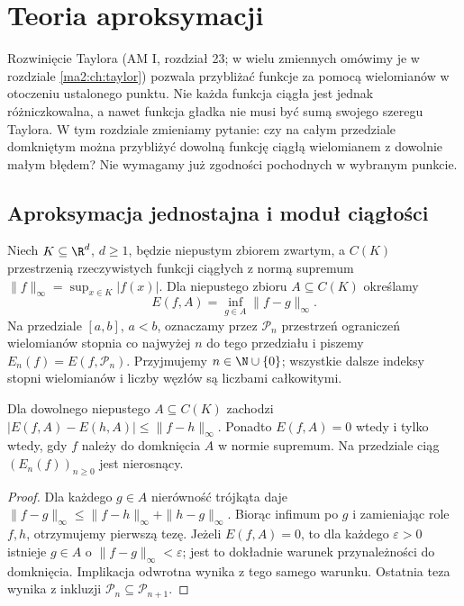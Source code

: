 \chapter{Teoria aproksymacji}
\label{ma2:ch:approximation}

Rozwinięcie Taylora (AM I, rozdział 23;
w wielu zmiennych omówimy je w rozdziale
\ref{ma2:ch:taylor}) pozwala przybliżać funkcje
za pomocą wielomianów w otoczeniu ustalonego punktu.
Nie każda funkcja ciągła jest jednak różniczkowalna,
a nawet funkcja gładka nie musi być sumą swojego
szeregu Taylora. W tym rozdziale zmieniamy pytanie:
czy na całym przedziale domkniętym można przybliżyć
dowolną funkcję ciągłą wielomianem z dowolnie małym
błędem? Nie wymagamy już zgodności pochodnych
w wybranym punkcie.

\section{Aproksymacja jednostajna i moduł ciągłości}

\begin{definicja}
\label{ma2:def:approx-best-error}
Niech $K\subseteq\R^d$, $d\ge1$, będzie niepustym zbiorem
zwartym, a $C(K)$ przestrzenią rzeczywistych funkcji
ciągłych z normą supremum
$\|f\|_\infty=\sup_{x\in K}|f(x)|$.
Dla niepustego zbioru $A\subseteq C(K)$ określamy
\[
 E(f,A)=\inf_{g\in A}\|f-g\|_\infty.
\]
Na przedziale $[a,b]$, $a<b$, oznaczamy przez
$\mathcal P_n$ przestrzeń ograniczeń wielomianów
stopnia co najwyżej $n$ do tego przedziału
i piszemy $E_n(f)=E(f,\mathcal P_n)$.
Przyjmujemy $n\in\N\cup\{0\}$; wszystkie dalsze
indeksy stopni wielomianów i liczby węzłów
są liczbami całkowitymi.
\end{definicja}

\begin{stwierdzenie}
\label{ma2:prop:approx-distance}
Dla dowolnego niepustego $A\subseteq C(K)$
zachodzi $|E(f,A)-E(h,A)|\le\|f-h\|_\infty$.
Ponadto $E(f,A)=0$ wtedy i tylko wtedy,
gdy $f$ należy do domknięcia $A$ w normie supremum.
Na przedziale ciąg $(E_n(f))_{n\ge0}$ jest
nierosnący.
\end{stwierdzenie}
\begin{proof}
Dla każdego $g\in A$ nierówność trójkąta daje
$\|f-g\|_\infty\le\|f-h\|_\infty+\|h-g\|_\infty$.
Biorąc infimum po $g$ i zamieniając role $f,h$,
otrzymujemy pierwszą tezę. Jeżeli $E(f,A)=0$,
to dla każdego $\varepsilon>0$ istnieje $g\in A$
o $\|f-g\|_\infty<\varepsilon$; jest to dokładnie
warunek przynależności do domknięcia.
Implikacja odwrotna wynika z tego samego warunku.
Ostatnia teza wynika z inkluzji
$\mathcal P_n\subseteq\mathcal P_{n+1}$.
\end{proof}

